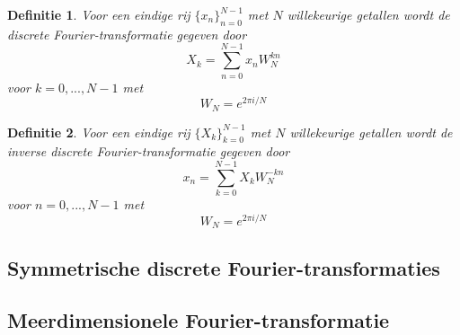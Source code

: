 \documentclass{article}
\newtheorem{mydef}{Definitie}
\begin{document}
	\begin{mydef}
		Voor een eindige rij $\{x_n\}_{n=0}^{N-1}$ met $N$ willekeurige getallen wordt de discrete Fourier-transformatie gegeven door
		$$
			X_k = \sum_{n=0}^{N-1} x_n W_N^{kn}  
		$$
		voor $k=0, ... , N-1$ met
		$$
			W_N = e^{2\pi i/N}
		$$
	\end{mydef}

	\begin{mydef}
		Voor een eindige rij $\{X_k\}_{k=0}^{N-1}$ met $N$ willekeurige getallen wordt de inverse discrete Fourier-transformatie gegeven door
		$$
		x_n = \sum_{k=0}^{N-1} X_k W_N^{-kn}  
		$$
		voor $n=0, ... , N-1$ met
		$$
		W_N = e^{2\pi i/N}
		$$
	\end{mydef}
	
	\subsection{Symmetrische discrete Fourier-transformaties}
	
	\subsection{Meerdimensionele Fourier-transformatie}
	
	
	
	
\end{document}
